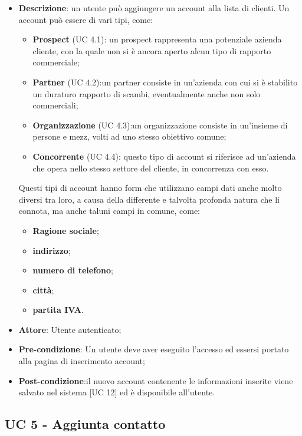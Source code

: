 \begin{itemize}
	\item \textbf{Descrizione}: un utente può aggiungere un account alla lista di clienti. Un account può essere di vari tipi, come:
	\begin{itemize}
		\item \textbf{Prospect} (UC 4.1): un prospect rappresenta una potenziale azienda cliente, con la quale non si è ancora aperto alcun tipo di rapporto commerciale;
		\item \textbf{Partner} (UC 4.2):un partner consiste in un'azienda con cui si è stabilito un duraturo rapporto di scambi, eventualmente anche non solo commerciali;
		\item \textbf{Organizzazione} (UC 4.3):un organizzazione consiste in un'insieme di persone e mezz, volti ad uno stesso obiettivo comune;
		\item \textbf{Concorrente} (UC 4.4): questo tipo di account si riferisce ad un'azienda che opera nello stesso settore del cliente, in concorrenza con esso.
	\end{itemize}
   Questi tipi di account hanno form che utilizzano campi dati anche molto diversi tra loro, a causa della differente e talvolta profonda natura che li connota, ma anche taluni campi in comune, come:
   \begin{itemize}
   		\item \textbf{Ragione sociale};
		\item \textbf{indirizzo};
		\item \textbf{numero di telefono};
		\item \textbf{città};
		\item \textbf{partita IVA}.
	\end{itemize}
	\item \textbf{Attore}: Utente autenticato;
	\item \textbf{Pre-condizione}: Un utente deve aver eseguito l'accesso ed essersi portato alla pagina di inserimento account;
	\item \textbf{Post-condizione}:il nuovo account contenente le informazioni inserite viene salvato nel sistema [UC 12] ed è disponibile all'utente.
\end{itemize}

\subsection{UC 5 - Aggiunta contatto}

